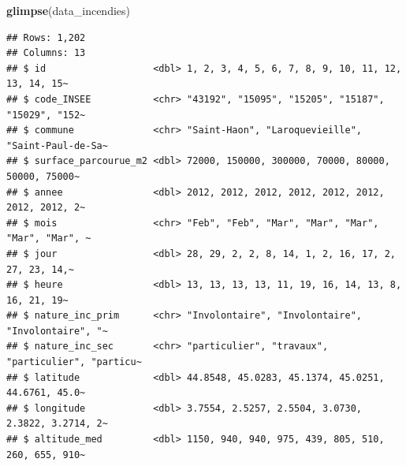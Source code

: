 \documentclass[
]{article}
\newenvironment{Shaded}{\begin{snugshade}}{\end{snugshade}}
\newcommand{\FunctionTok}[1]{\textcolor[rgb]{0.13,0.29,0.53}{\textbf{#1}}}
\newcommand{\NormalTok}[1]{#1}
\begin{document}
\begin{Shaded}
\begin{Highlighting}[]
\FunctionTok{glimpse}\NormalTok{(data\_incendies)}
\end{Highlighting}
\end{Shaded}

\begin{verbatim}
## Rows: 1,202
## Columns: 13
## $ id                   <dbl> 1, 2, 3, 4, 5, 6, 7, 8, 9, 10, 11, 12, 13, 14, 15~
## $ code_INSEE           <chr> "43192", "15095", "15205", "15187", "15029", "152~
## $ commune              <chr> "Saint-Haon", "Laroquevieille", "Saint-Paul-de-Sa~
## $ surface_parcourue_m2 <dbl> 72000, 150000, 300000, 70000, 80000, 50000, 75000~
## $ annee                <dbl> 2012, 2012, 2012, 2012, 2012, 2012, 2012, 2012, 2~
## $ mois                 <chr> "Feb", "Feb", "Mar", "Mar", "Mar", "Mar", "Mar", ~
## $ jour                 <dbl> 28, 29, 2, 2, 8, 14, 1, 2, 16, 17, 2, 27, 23, 14,~
## $ heure                <dbl> 13, 13, 13, 13, 11, 19, 16, 14, 13, 8, 16, 21, 19~
## $ nature_inc_prim      <chr> "Involontaire", "Involontaire", "Involontaire", "~
## $ nature_inc_sec       <chr> "particulier", "travaux", "particulier", "particu~
## $ latitude             <dbl> 44.8548, 45.0283, 45.1374, 45.0251, 44.6761, 45.0~
## $ longitude            <dbl> 3.7554, 2.5257, 2.5504, 3.0730, 2.3822, 3.2714, 2~
## $ altitude_med         <dbl> 1150, 940, 940, 975, 439, 805, 510, 260, 655, 910~
\end{verbatim}
\end{document}
